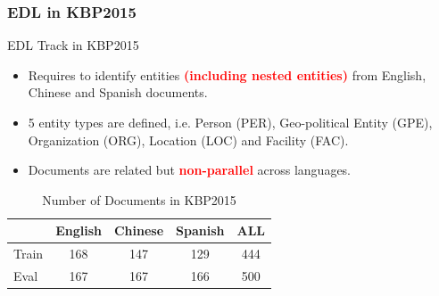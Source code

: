 \documentclass{beamer}
\begin{document}
\begin{frame}
\frametitle{EDL in KBP2015}
\begin{block}{EDL Track in KBP2015 \parencite{kbpoverview2015}}
\begin{itemize}
	\item Requires to identify entities \textbf{\textcolor{red}{(including nested entities)}} from English, Chinese and Spanish documents.
	\item 5 entity types are defined, i.e. Person (PER), Geo-political Entity (GPE), Organization (ORG), Location (LOC) and Facility (FAC).
	\item Documents are related but \textbf{\textcolor{red}{non-parallel}} across languages. 
\end{itemize}
\end{block}
\begin{table}
		\centering
		\begin{tabular}{|l|c|c|c|c|}
			\hline
			& English & Chinese & Spanish & ALL \\
			\hline
			Train & 168 & 147 & 129 & 444 \\
			Eval & 167 & 167 & 166 & 500 \\
			\hline
		\end{tabular}%
	\caption{\scriptsize Number of Documents in KBP2015}
	\label{tbl:kbp2015stat}
\end{table}
\end{frame}
\end{document}
